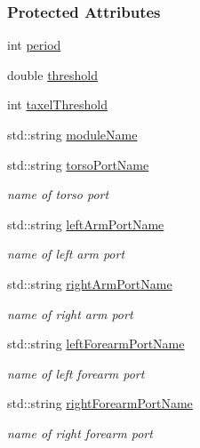 \subsubsection*{Protected Attributes}
\begin{DoxyCompactItemize}
\item 
int \hyperlink{group__touchDetector_a580ee85bb0155647e5cf90442006da48}{period}
\item 
double \hyperlink{group__touchDetector_af9e4938a7f5c9d643efd7ba6cdf752e4}{threshold}
\item 
int \hyperlink{group__touchDetector_a7eb052be91e2b3525a3656c5d3bb350b}{taxel\+Threshold}
\item 
std\+::string \hyperlink{group__touchDetector_aeb11d25fee00f8a83cc3c77ea5f42454}{module\+Name}
\item 
std\+::string \hyperlink{group__touchDetector_abf46b79365acac4d65f126ca2af506a6}{torso\+Port\+Name}
\begin{DoxyCompactList}\small\item\em name of torso port \end{DoxyCompactList}\item 
std\+::string \hyperlink{group__touchDetector_acae3d6cccb0a789e8abb71d70eed9bc8}{left\+Arm\+Port\+Name}
\begin{DoxyCompactList}\small\item\em name of left arm port \end{DoxyCompactList}\item 
std\+::string \hyperlink{group__touchDetector_a7aa8558ce23f4f46b0ff536e5283b0a5}{right\+Arm\+Port\+Name}
\begin{DoxyCompactList}\small\item\em name of right arm port \end{DoxyCompactList}\item 
std\+::string \hyperlink{group__touchDetector_a38f40c16f5969f69e305c89699c0d8af}{left\+Forearm\+Port\+Name}
\begin{DoxyCompactList}\small\item\em name of left forearm port \end{DoxyCompactList}\item 
std\+::string \hyperlink{group__touchDetector_a907d6a20fce66d9f5b2ae0030a01b46c}{right\+Forearm\+Port\+Name}
\begin{DoxyCompactList}\small\item\em name of right forearm port \end{DoxyCompactList}\item 

\end{DoxyCompactItemize}
